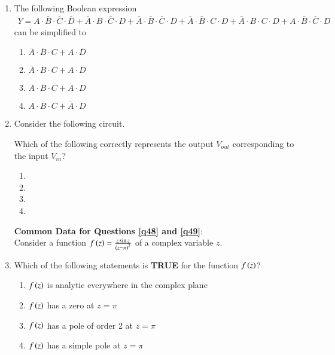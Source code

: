 \documentclass[journal]{IEEEtran}
\begin{document}
\begin{enumerate}
    \item The following Boolean expression
    \begin{align*}
    Y = A \cdot \overline{B} \cdot \overline{C} \cdot \overline{D}
    + \overline{A} \cdot B \cdot \overline{C} \cdot D
    + \overline{A} \cdot \overline{B} \cdot \overline{C} \cdot D
    + \overline{A} \cdot \overline{B} \cdot C \cdot D
    + \overline{A} \cdot B \cdot C \cdot D
    + A \cdot \overline{B} \cdot \overline{C} \cdot D
    \end{align*}
    can be simplified to
    \begin{multicols}{2}
        \begin{enumerate}
            \item $\overline{A} \cdot \overline{B} \cdot C + A \cdot \overline{D}$
            \item $\overline{A} \cdot B \cdot \overline{C} + A \cdot \overline{D}$
            \item $A \cdot \overline{B} \cdot \overline{C} + \overline{A} \cdot D$
            \item $A \cdot \overline{B} \cdot C + \overline{A} \cdot D$
        \end{enumerate}
    \end{multicols}

    \item Consider the following circuit.

    

    Which of the following correctly represents the output $V_{out}$ corresponding to the input $V_{in}$?

    \begin{multicols}{2}
        \begin{enumerate}
            \item 
            \item 
            \item 
            \item 
        \end{enumerate}
    \end{multicols}

    \textbf{Common Data for Questions \ref{q48} and \ref{q49}}: \\
    Consider a function $f\left(z\right) = \frac{z \sin z}{\left(z - \pi\right)^2}$ of a complex variable $z$.
    
    \item \label{q48} Which of the following statements is \textbf{TRUE} for the function $f\left(z\right)$?
    \begin{enumerate}
        \item $f\left(z\right)$ is analytic everywhere in the complex plane
        \item $f\left(z\right)$ has a zero at $z = \pi$
        \item $f\left(z\right)$ has a pole of order 2 at $z = \pi$
        \item $f\left(z\right)$ has a simple pole at $z = \pi$
    \end{enumerate}
    

\end{enumerate}
\end{document}

